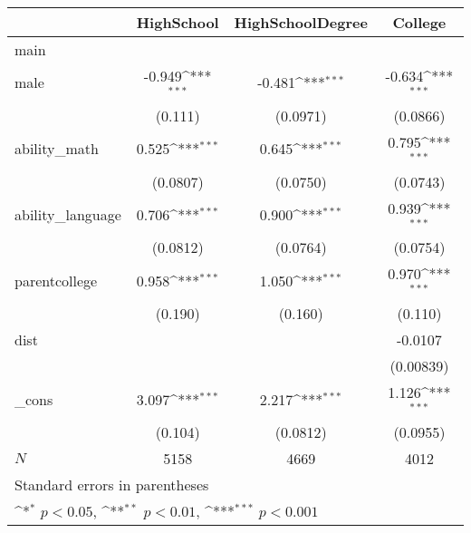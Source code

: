 {
\def\sym#1{\ifmmode^{#1}\else\(^{#1}\)\fi}
\begin{tabular}{l*{3}{c}}
\hline\hline
            &\multicolumn{1}{c}{HighSchool}&\multicolumn{1}{c}{HighSchoolDegree}&\multicolumn{1}{c}{College}\\
\hline
main        &                     &                     &                     \\
male        &      -0.949\sym{***}&      -0.481\sym{***}&      -0.634\sym{***}\\
            &     (0.111)         &    (0.0971)         &    (0.0866)         \\
[1em]
ability\_math&       0.525\sym{***}&       0.645\sym{***}&       0.795\sym{***}\\
            &    (0.0807)         &    (0.0750)         &    (0.0743)         \\
[1em]
ability\_language&       0.706\sym{***}&       0.900\sym{***}&       0.939\sym{***}\\
            &    (0.0812)         &    (0.0764)         &    (0.0754)         \\
[1em]
parentcollege&       0.958\sym{***}&       1.050\sym{***}&       0.970\sym{***}\\
            &     (0.190)         &     (0.160)         &     (0.110)         \\
[1em]
dist        &                     &                     &     -0.0107         \\
            &                     &                     &   (0.00839)         \\
[1em]
\_cons      &       3.097\sym{***}&       2.217\sym{***}&       1.126\sym{***}\\
            &     (0.104)         &    (0.0812)         &    (0.0955)         \\
\hline
\(N\)       &        5158         &        4669         &        4012         \\
\hline\hline
\multicolumn{4}{l}{\footnotesize Standard errors in parentheses}\\
\multicolumn{4}{l}{\footnotesize \sym{*} \(p<0.05\), \sym{**} \(p<0.01\), \sym{***} \(p<0.001\)}\\
\end{tabular}
}
